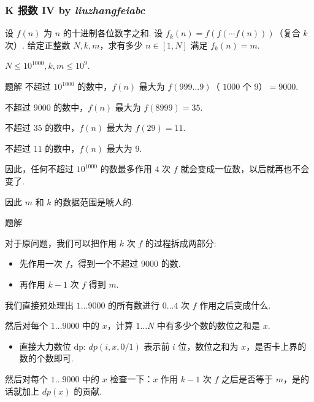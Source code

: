 \frame
{
  \frametitle{K 报数 IV {by \itshape liuzhangfeiabc}}

	设 $f(n)$ 为 $n$ 的十进制各位数字之和.
	设 $f_k(n)=f(f(\cdots f(n)))$（复合 $k$ 次）.
	给定正整数 $N, k, m$，求有多少 $n\in[1,N]$ 满足 $f_k(n)=m$.

	$N \le 10^{1000}, k, m \le 10^9$.

}

\begin{frame}{题解}
	不超过 $10^{1000}$ 的数中，$f(n)$ 最大为 $f(999\dots 9)$（ $1000$ 个 $9$）$=9000$.

	不超过 $9000$ 的数中，$f(n)$ 最大为 $f(8999)=35$.

	不超过 $35$ 的数中，$f(n)$ 最大为 $f(29)=11$.

	不超过 $11$ 的数中，$f(n)$ 最大为 $9$.

	因此，任何不超过 $10^{1000}$ 的数最多作用 $4$ 次 $f$ 就会变成一位数，以后就再也不会变了.

	因此 $m$ 和 $k$ 的数据范围是唬人的.
\end{frame}

\begin{frame}{题解}

	对于原问题，我们可以把作用 $k$ 次 $f$ 的过程拆成两部分:

	\begin{itemize}
	\item 先作用一次 $f$，得到一个不超过 $9000$ 的数.
	\item 再作用 $k-1$ 次 $f$ 得到 $m$.
	\end{itemize}

	我们直接预处理出 $1\dots 9000$ 的所有数进行 $0\dots 4$ 次 $f$ 作用之后变成什么.

	然后对每个 $1\dots 9000$ 中的 $x$，计算 $1\dots N$ 中有多少个数的数位之和是 $x$.

	\begin{itemize}
	\item 直接大力数位 dp: $dp(i,x,0/1)$ 表示前 $i$ 位，数位之和为 $x$，是否卡上界的数的个数即可.
	\end{itemize}

	然后对每个 $1\dots 9000$ 中的 $x$ 检查一下：$x$ 作用 $k-1$ 次 $f$ 之后是否等于 $m$，是的话就加上 $dp(x)$ 的贡献.

\end{frame}